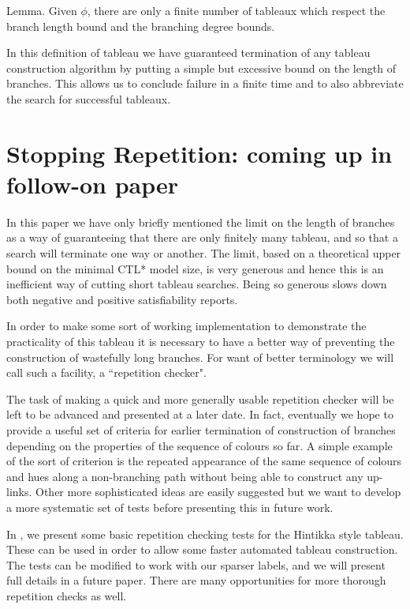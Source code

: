 \documentclass[submission,copyright,creativecommons]{eptcs}
\newenvironment{lemma}{Lemma. }{}
\begin{document}
\begin{lemma}
Given $\phi$,
there are only a finite 
number of tableaux 
which respect the branch length bound 
and the branching degree bounds.
\end{lemma}

In this definition of tableau we have guaranteed
termination of any 
tableau construction
algorithm
by putting a simple 
but excessive bound
on the length of branches.
This allows us to 
conclude failure in a finite time
and to also abbreviate the
search for successful tableaux.


\section{Stopping Repetition: coming up in follow-on paper}
\label{sec:stop}

In this paper we have only briefly
mentioned the limit on the length
of branches as a way of guaranteeing that
there are only finitely many tableau,
and so that a search will terminate
one way or another.
The limit,
based on a theoretical upper bound
on the minimal CTL* model size,
is very generous and hence this is an inefficient
way of
cutting short tableau searches.
Being so generous slows down both negative and positive
satisfiability reports.

In order to make some sort of working
implementation to demonstrate the 
practicality of this tableau
it is necessary to have a better way
of preventing the construction
of wastefully long branches.
For want of better terminology
we will call such a facility,
a ``repetition checker".

The task of making a quick
and more generally usable
repetition checker will be left 
to be advanced and presented at a later date.
In fact, eventually we hope to
provide a useful  set of criteria
for earlier termination
of construction of branches
depending on the 
properties of the
sequence of colours
so far.
A simple example
of the sort of criterion 
is the repeated appearance of the same
sequence of colours and hues
along a non-branching path
without being able to construct any
up-links.
Other more sophisticated ideas
are easily suggested
but we want to
develop a more systematic
set of tests 
before presenting this
in future work.

In \cite{Rey:startab}, we
present some basic repetition checking 
tests
for the Hintikka style tableau.
These can be used in order to allow
some faster automated tableau
construction.
The tests can be modified to work with 
our sparser labels,
and we will present full details in a future paper.
There are many opportunities for more thorough 
repetition checks as well.
\end{document}
